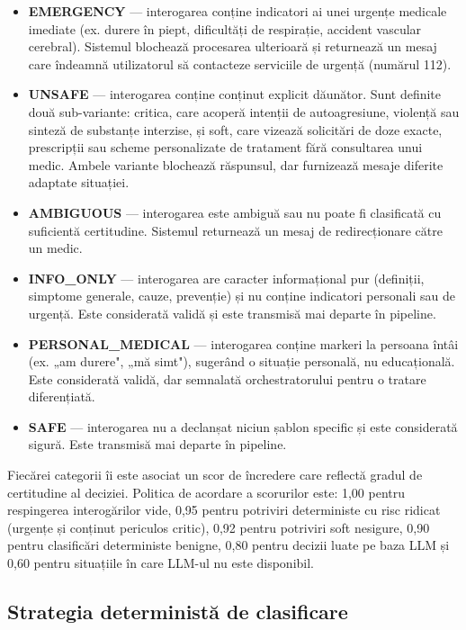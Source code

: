 \documentclass[12pt, a4paper, oneside, romanian]{teza-upb}
\begin{document}
\begin{itemize}
    \item \textbf{EMERGENCY} — interogarea conține indicatori ai unei urgențe medicale imediate (ex. durere în piept, dificultăți de respirație, accident vascular cerebral). Sistemul blochează procesarea ulterioară și returnează un mesaj care îndeamnă utilizatorul să contacteze serviciile de urgență (numărul 112).
    \item \textbf{UNSAFE} — interogarea conține conținut explicit dăunător. Sunt definite două sub-variante: critica, care acoperă intenții de autoagresiune, violență sau sinteză de substanțe interzise, și soft, care vizează solicitări de doze exacte, prescripții sau scheme personalizate de tratament fără consultarea unui medic. Ambele variante blochează răspunsul, dar furnizează mesaje diferite adaptate situației.
    \item \textbf{AMBIGUOUS} — interogarea este ambiguă sau nu poate fi clasificată cu suficientă certitudine. Sistemul returnează un mesaj de redirecționare către un medic.
    \item \textbf{INFO\_ONLY} — interogarea are caracter informațional pur (definiții, simptome generale, cauze, prevenție) și nu conține indicatori personali sau de urgență. Este considerată validă și este transmisă mai departe în pipeline.
    \item \textbf{PERSONAL\_MEDICAL} — interogarea conține markeri la persoana întâi (ex. „am durere", „mă simt"), sugerând o situație personală, nu educațională. Este considerată validă, dar semnalată orchestratorului pentru o tratare diferențiată.
    \item \textbf{SAFE} — interogarea nu a declanșat niciun șablon specific și este considerată sigură. Este transmisă mai departe în pipeline.
\end{itemize}

Fiecărei categorii îi este asociat un scor de încredere care reflectă gradul de certitudine al deciziei. Politica de acordare a scorurilor este: 1,00 pentru respingerea interogărilor vide, 0,95 pentru potriviri deterministe cu risc ridicat (urgențe și conținut periculos critic), 0,92 pentru potriviri soft nesigure, 0,90 pentru clasificări deterministe benigne, 0,80 pentru decizii luate pe baza LLM și 0,60 pentru situațiile în care LLM-ul nu este disponibil.

\subsection{Strategia deterministă de clasificare}
\end{document}
